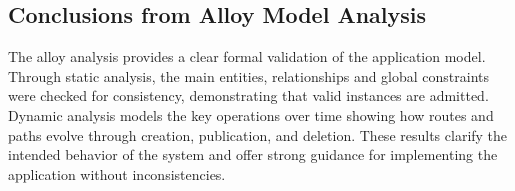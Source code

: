 \subsection{ Conclusions from Alloy Model Analysis}
The alloy analysis provides a clear formal validation of the application model. Through static analysis, the main entities, relationships and global constraints were checked for consistency, demonstrating that valid instances are admitted.\\
Dynamic analysis models the key operations over time showing how routes and paths evolve through creation, publication, and deletion.
These results clarify the intended behavior of the system and offer strong guidance for implementing the application without inconsistencies.